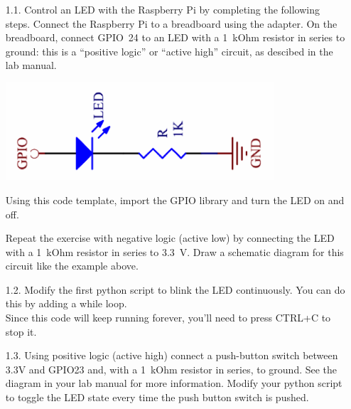 \begin{enumerate}
\item [1.1.] Control an LED with the Raspberry Pi by completing the following steps.
Connect the Raspberry Pi to a breadboard using the adapter.
On the breadboard, connect GPIO~24 to an LED with a 1~kOhm resistor in series to ground: this is a ``positive logic'' or ``active high'' circuit, as descibed in the lab manual.

\vspace*{-3mm}
\begin{center}                                        
{\includegraphics[width=10cm]{figs/ActiveHighLED}}
\end{center}

\newpage
Using this code template, import the GPIO library and turn the LED on and off.


Repeat the exercise with negative logic (active low) by connecting the LED with a 1~kOhm resistor in series to 3.3~V.
Draw a schematic diagram for this circuit like the example above.
 

\item [1.2.] Modify the first python script to blink the LED continuously.
You can do this by adding a while loop. \\



Since this code will keep running forever, you'll need to press CTRL+C to stop it.
 

\item [1.3.] Using positive logic (active high) connect a push-button switch between 3.3V and GPIO23 and, with a 1~kOhm resistor in series, to ground.
See the diagram in your lab manual for more information.
Modify your python script to toggle the LED state every time the push button switch is pushed. \\



\end{enumerate}

